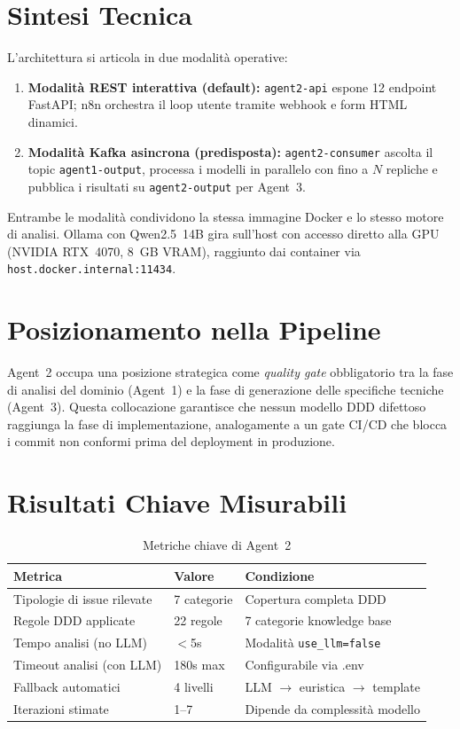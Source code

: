 \documentclass[12pt,a4paper]{report}
\begin{document}
\section{Sintesi Tecnica}

L'architettura si articola in due modalità operative:

\begin{enumerate}
  \item \textbf{Modalità REST interattiva (default):} \texttt{agent2-api} espone
        12 endpoint FastAPI; n8n orchestra il loop utente tramite webhook e form HTML
        dinamici.
  \item \textbf{Modalità Kafka asincrona (predisposta):} \texttt{agent2-consumer}
        ascolta il topic \texttt{agent1-output}, processa i modelli in parallelo con
        fino a $N$ repliche e pubblica i risultati su \texttt{agent2-output} per Agent~3.
\end{enumerate}

Entrambe le modalità condividono la stessa immagine Docker e lo stesso motore di analisi.
Ollama con Qwen2.5~14B gira sull'host con accesso diretto alla GPU (NVIDIA RTX~4070,
8~GB VRAM), raggiunto dai container via \texttt{host.docker.internal:11434}.

\section{Posizionamento nella Pipeline}

Agent~2 occupa una posizione strategica come \textit{quality gate} obbligatorio tra
la fase di analisi del dominio (Agent~1) e la fase di generazione delle specifiche
tecniche (Agent~3). Questa collocazione garantisce che nessun modello DDD difettoso
raggiunga la fase di implementazione, analogamente a un gate CI/CD che blocca i
commit non conformi prima del deployment in produzione.

\section{Risultati Chiave Misurabili}

\begin{table}[H]
\centering
\renewcommand{\arraystretch}{1.3}
\begin{tabularx}{\textwidth}{l l X}
\toprule
\textbf{Metrica} & \textbf{Valore} & \textbf{Condizione} \\
\midrule
Tipologie di issue rilevate & 7 categorie & Copertura completa DDD \\
Regole DDD applicate & 22 regole & 7 categorie knowledge base \\
Tempo analisi (no LLM) & $<$5s & Modalità \texttt{use\_llm=false} \\
Timeout analisi (con LLM) & 180s max & Configurabile via .env \\
Fallback automatici & 4 livelli & LLM $\rightarrow$ euristica $\rightarrow$ template \\
Iterazioni stimate & 1--7 & Dipende da complessità modello \\
\bottomrule
\end{tabularx}
\caption{Metriche chiave di Agent~2}
\label{tab:exec-metrics}
\end{table}
\end{document}
